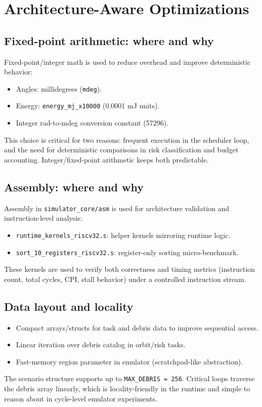 \documentclass[11pt,a4paper]{article}
\begin{document}
\section{Architecture-Aware Optimizations}
\subsection*{Fixed-point arithmetic: where and why}
Fixed-point/integer math is used to reduce overhead and improve deterministic behavior:
\begin{itemize}[leftmargin=1.5em]
    \item Angles: millidegrees (\texttt{mdeg}).
    \item Energy: \texttt{energy\_mj\_x10000} (0.0001 mJ units).
    \item Integer rad-to-mdeg conversion constant (57296).
\end{itemize}
This choice is critical for two reasons: frequent execution in the scheduler loop, and the need for deterministic comparisons in risk classification and budget accounting. Integer/fixed-point arithmetic keeps both predictable.

\subsection*{Assembly: where and why}
Assembly in \texttt{simulator\_core/asm} is used for architecture validation and instruction-level analysis:
\begin{itemize}[leftmargin=1.5em]
    \item \texttt{runtime\_kernels\_riscv32.s}: helper kernels mirroring runtime logic.
    \item \texttt{sort\_10\_registers\_riscv32.s}: register-only sorting micro-benchmark.
\end{itemize}
These kernels are used to verify both correctness and timing metrics (instruction count, total cycles, CPI, stall behavior) under a controlled instruction stream.

\subsection*{Data layout and locality}
\begin{itemize}[leftmargin=1.5em]
    \item Compact arrays/structs for task and debris data to improve sequential access.
    \item Linear iteration over debris catalog in orbit/risk tasks.
    \item Fast-memory region parameter in emulator (scratchpad-like abstraction).
\end{itemize}
The scenario structure supports up to \texttt{MAX\_DEBRIS = 256}. Critical loops traverse the debris array linearly, which is locality-friendly in the runtime and simple to reason about in cycle-level emulator experiments.
\end{document}
